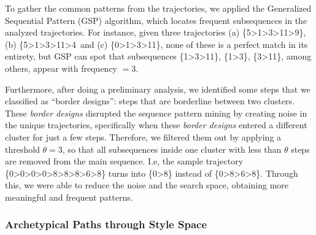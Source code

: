 To gather the common patterns from the trajectories, we applied the Generalized Sequential Pattern (GSP) algorithm, which locates frequent subsequences in the analyzed trajectories. For instance, given three trajectories (a) \{5\textgreater1\textgreater3\textgreater11\textgreater9\}, (b) \{5\textgreater1\textgreater3\textgreater11\textgreater4\, and (c) \{0\textgreater1\textgreater3\textgreater11\}, none of these is a perfect match in its entirety, but GSP can spot that subsequences \{1\textgreater3\textgreater11\}, \{1\textgreater3\}, \{3\textgreater11\}, among others, appear with frequency $= 3$.


Furthermore, after doing a preliminary analysis, we identified some steps that we classified as ``border designs'': steps that are borderline between two clusters. These \textit{border designs} disrupted the sequence pattern mining by creating noise in the unique trajectories, specifically when these \textit{border designs} entered a different cluster for just a few steps. %
Therefore, we filtered them out by applying a threshold $\theta = 3$, so that all subsequences inside one cluster with less than $\theta$ steps are removed from the main sequence. I.e, the sample trajectory \{0\textgreater0\textgreater0\textgreater0\textgreater8\textgreater8\textgreater8\textgreater6\textgreater8\} turns into \{0\textgreater8\} instead of \{0\textgreater8\textgreater6\textgreater8\}. Through this, we were able to reduce the noise and the search space, obtaining more meaningful and frequent patterns.

\subsubsection{Archetypical Paths through Style Space}



